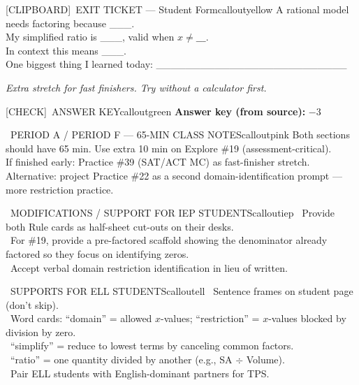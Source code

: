 \documentclass[11pt]{article}
\newcommand{\IconCheck}{[CHECK]}
\newcommand{\IconClipboard}{[CLIPBOARD]}
\newcommand{\teacheranswerbox}[2]{%
  \begin{callout}{#1}{calloutgreen}
  #2
  \end{callout}
}
\begin{document}
\begin{callout}{\IconClipboard\ EXIT TICKET --- Student Form}{calloutyellow}
A rational model needs factoring because \_\_\_.\\
My simplified ratio is \_\_\_, valid when \(x \ne \_\_\_\).\\
In context this means \_\_\_.\\
One biggest thing I learned today: \_\_\_\_\_\_\_\_\_\_\_\_\_\_\_\_\_\_\_\_\_\_\_\_\_\_
\end{callout}

\textit{Extra stretch for fast finishers. Try without a calculator first.}


\teacheranswerbox{\IconCheck\ ANSWER KEY}{%
\textbf{Answer key (from source):} \(-3\)
}

\clearpage

\begin{callout}{\IconClock\ PERIOD A / PERIOD F --- 65-MIN CLASS NOTES}{calloutpink}
Both sections should have 65 min. Use extra 10 min on Explore \#19 (assessment-critical).\\
If finished early: Practice \#39 (SAT/ACT MC) as fast-finisher stretch.\\
Alternative: project Practice \#22 as a second domain-identification prompt --- more restriction practice.
\end{callout}

\begin{callout}{\IconPuzzle\ MODIFICATIONS / SUPPORT FOR IEP STUDENTS}{calloutiep}
\textbullet\ Provide both Rule cards as half-sheet cut-outs on their desks.\\
\textbullet\ For \#19, provide a pre-factored scaffold showing the denominator already factored so they focus on identifying zeros.\\
\textbullet\ Accept verbal domain restriction identification in lieu of written.
\end{callout}

\begin{callout}{\IconGlobe\ SUPPORTS FOR ELL STUDENTS}{calloutell}
\textbullet\ Sentence frames on student page (don't skip).\\
\textbullet\ Word cards: ``domain'' = allowed \(x\)-values; ``restriction'' = \(x\)-values blocked by division by zero.\\
\textbullet\ ``simplify'' = reduce to lowest terms by canceling common factors.\\
\textbullet\ ``ratio'' = one quantity divided by another (e.g., SA \(\div\) Volume).\\
\textbullet\ Pair ELL students with English-dominant partners for TPS.
\end{callout}
\end{document}
